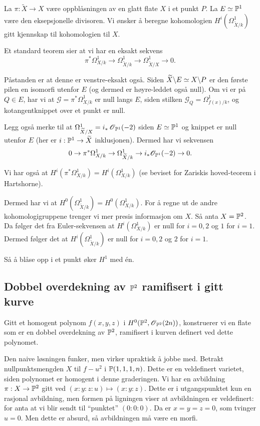 \documentclass[11pt, norsk]{article}
\begin{document}
La $\pi:\widetilde X \to X$ være oppblåsningen av en glatt flate $X$ i et punkt $P$. La $E \simeq \mathbb{P}^1$ være den eksepsjonelle divisoren. Vi ønsker å beregne kohomologien $H^i(\Omega_{\widetilde X/k}^1)$ gitt kjennskap til kohomologien til $X$.

Et standard teorem sier at vi har en eksakt sekvens
$$
\pi^\ast \Omega^1_{X/k} \to \Omega^1_{\widetilde X/k} \to \Omega^1_{\widetilde X/X} \to 0.
$$

Påstanden er at denne er venstre-eksakt også. Siden $\widetilde X \backslash E \simeq X \backslash P$ er den første pilen en isomorfi utenfor $E$ (og dermed er høyre-leddet også null). Om vi er på $Q \in E$, har vi at $\mathscr G = {\pi^\ast \Omega_{X/k}^1}$ er null langs $E$, siden stilken $\mathscr G_Q=\Omega_{f(x)/k}^1$, og kotangentknippet over et punkt er null.

Legg også merke til at $\Omega^1_{\widetilde X/X}=i_\ast \operatorname{\mathscr{O}}_{\mathbb{P}^1}(-2)$ siden $E \simeq \mathbb{P}^1$ og knippet er null utenfor $E$ (her er $i:\mathbb{P}^1 \to \widetilde X$ inklusjonen). Dermed har vi sekvensen
$$
0 \to \pi^\ast \Omega^1_{X/k} \to \Omega^1_{\widetilde X/k} \to i_\ast \mathscr O_{\mathbb{P}^1} (-2) \to 0.
$$

Vi har også at $H^i(\pi^\ast \Omega^1_{X/k})= H^i(\Omega_{X/k}^1)$ (se beviset for Zariskis hoved-teorem i Hartshorne).

Dermed har vi at $H^0(\Omega_{\widetilde X/k}^1) = H^0(\Omega_{X/k}^1)$. For å regne ut de andre kohomologigruppene trenger vi mer presis informasjon om $X$. Så anta $X= \mathbb{P}^2$. Da følger det fra Euler-sekvensen at $H^i(\Omega_{X/k}^1)$ er null for $i=0,2$ og $1$ for $i=1$. Dermed følger det at $H^i(\Omega_{\widetilde X/k}^1)$ er null for $i=0,2$ og $2$ for $i=1$.

Så å blåse opp i et punkt øker $H^1$ med én.

\subsection{Dobbel overdekning av $\mathbb{P}^2$ ramifisert i gitt kurve}

Gitt et homogent polynom $f(x,y,z)$ i $H^0(\mathbb{P}^2,\operatorname{\mathscr{O}}_{\mathbb{P}^2}(2n))$, konstruerer vi en flate som er en dobbel overdekning av $\mathbb{P}^2$, ramifisert i kurven definert ved dette polynomet.

Den naive løsningen funker, men virker upraktisk å jobbe med. Betrakt nullpunktsmengden $X$ til $f-u^2$ i $\mathbb{P}(1,1,1,n)$. Dette er en veldefinert varietet, siden polynomet er homogent i denne graderingen.  Vi har en avbildning $\pi:X \to \mathbb{P}^2$ gitt ved $(x:y:z:u) \mapsto (x:y:z)$. Dette er i utgangspunktet kun en rasjonal avbildning, men formen på ligningen viser at avbildningen er veldefinert: for anta at vi blir sendt til ``punktet'' $(0:0:0)$. Da er $x=y=z=0$, som tvinger $u=0$. Men dette er absurd, så avbildningen må være en morfi.
\end{document}
